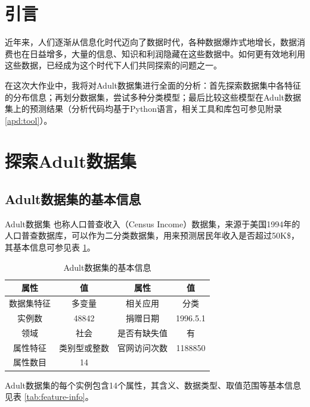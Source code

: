 \documentclass[12pt,a4paper]{article}
\theoremstyle{definition}
\begin{document}
\section{引言}

近年来，人们逐渐从信息化时代迈向了数据时代，各种数据爆炸式地增长，数据消费也在日益增多，大量的信息、知识和利润隐藏在这些数据中。如何更有效地利用这些数据，已经成为这个时代下人们共同探索的问题之一。

\vspace{0.01\linewidth}
在这次大作业中，我将对Adult数据集进行全面的分析：首先探索数据集中各特征的分布信息；再划分数据集，尝试多种分类模型；最后比较这些模型在Adult数据集上的预测结果（分析代码均基于Python语言，相关工具和库包可参见附录 \ref{apd:tool}）。

\section{探索Adult数据集}

\subsection{Adult数据集的基本信息}

Adult数据集 \cite{Dataset} 也称人口普查收入（Census Income）数据集，来源于美国1994年的人口普查数据库，可以作为二分类数据集，用来预测居民年收入是否超过50K\$，其基本信息可参见表 \ref{tab:basic-info}。

\begin{table}[H]
	\renewcommand\arraystretch{1.35}
	\caption{Adult数据集的基本信息}
	\label{tab:basic-info}
	\centering
	
	\begin{tabular}{c|c||c|c}
		\centering
		属性 & 值 & 属性 & 值 \\
		\hline
		\hline
		数据集特征 & 多变量 & 相关应用 & 分类 \\
		实例数 & 48842 & 捐赠日期 & 1996.5.1 \\
		领域 & 社会 & 是否有缺失值 & 有 \\
		属性特征 & 类别型或整数 & 官网访问次数 & 1188850 \\
		属性数目 & 14 & & \\
		
	\end{tabular}
\end{table}

\vspace{-0.01\linewidth}
Adult数据集的每个实例包含14个属性，其含义、数据类型、取值范围等基本信息见表 \ref{tab:feature-info}。
\end{document}
